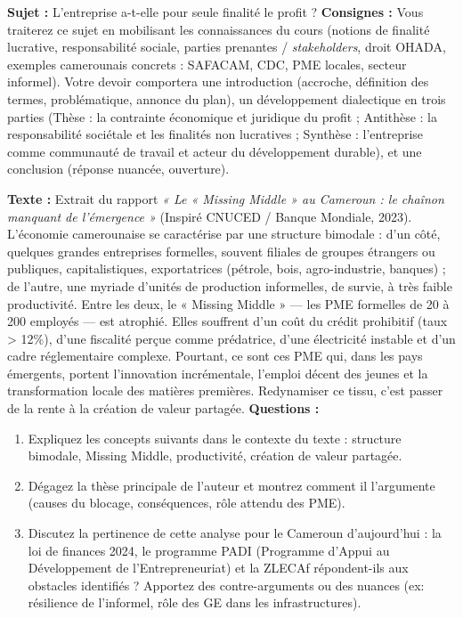 \documentclass[11pt]{article}
\newcommand{\cle}[1]{{\popxbold\color{popdark}#1}}
\newcounter{popsec}
\newcounter{popsub}
\newcommand{\courssub}[1]{%
  \stepcounter{popsub}%
  \par\vspace{9pt}\noindent{\popxbold\fontsize{11.5}{13}\selectfont\color{popink}{\color{poporange}\thepopsec.\thepopsub}\hspace{6pt}#1}\par\nopagebreak\vspace{4pt}
}
\begin{document}
\courssub{Je me prépare au Bac}

\begin{exercice}
\textbf{Sujet :} \og L'entreprise a-t-elle pour seule finalité le profit ? \fg
\vspace{0.2cm}
\textbf{Consignes :} Vous traiterez ce sujet en mobilisant les connaissances du cours (notions de finalité lucrative, responsabilité sociale, parties prenantes / \emph{stakeholders}, droit OHADA, exemples camerounais concrets : SAFACAM, CDC, PME locales, secteur informel). Votre devoir comportera une introduction (accroche, définition des termes, problématique, annonce du plan), un développement dialectique en trois parties (Thèse : la contrainte économique et juridique du profit ; Antithèse : la responsabilité sociétale et les finalités non lucratives ; Synthèse : l'entreprise comme communauté de travail et acteur du développement durable), et une conclusion (réponse nuancée, ouverture).
\end{exercice}

\begin{exercice}
\textbf{Texte :} Extrait du rapport \emph{« Le « Missing Middle » au Cameroun : le chaînon manquant de l'émergence »} (Inspiré CNUCED / Banque Mondiale, 2023).
\og L'économie camerounaise se caractérise par une structure bimodale : d'un côté, quelques grandes entreprises formelles, souvent filiales de groupes étrangers ou publiques, capitalistiques, exportatrices (pétrole, bois, agro-industrie, banques) ; de l'autre, une myriade d'unités de production informelles, de survie, à très faible productivité. Entre les deux, le « Missing Middle » — les PME formelles de 20 à 200 employés — est atrophié. Elles souffrent d'un coût du crédit prohibitif (taux > 12\%), d'une fiscalité perçue comme prédatrice, d'une électricité instable et d'un cadre réglementaire complexe. Pourtant, ce sont ces PME qui, dans les pays émergents, portent l'innovation incrémentale, l'emploi décent des jeunes et la transformation locale des matières premières. Redynamiser ce tissu, c'est passer de la rente à la création de valeur partagée. \fg
\vspace{0.2cm}
\textbf{Questions :}
\begin{enumerate}
    \item Expliquez les concepts suivants dans le contexte du texte : \cle{structure bimodale}, \cle{Missing Middle}, \cle{productivité}, \cle{création de valeur partagée}.
    \item Dégagez la thèse principale de l'auteur et montrez comment il l'argumente (causes du blocage, conséquences, rôle attendu des PME).
    \item Discutez la pertinence de cette analyse pour le Cameroun d'aujourd'hui : la loi de finances 2024, le programme PADI (Programme d'Appui au Développement de l'Entrepreneuriat) et la ZLECAf répondent-ils aux obstacles identifiés ? Apportez des contre-arguments ou des nuances (ex: résilience de l'informel, rôle des GE dans les infrastructures).
\end{enumerate}
\end{exercice}
\end{document}
